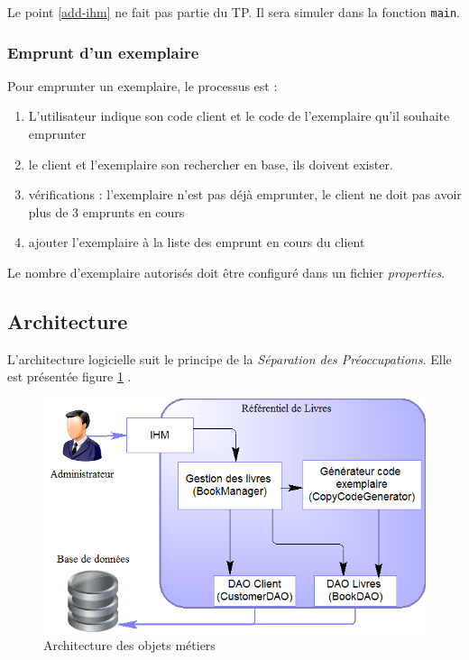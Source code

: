 \documentclass[small,algo]{dushClass}
\begin{document}
Le point \ref{add-ihm} ne fait pas partie du TP. Il sera simuler dans la fonction \texttt{main}.

\subsubsection{Emprunt d'un exemplaire}

Pour emprunter un exemplaire, le processus est :
\begin{enumerate}
\item L'utilisateur indique son code client et le code de l'exemplaire qu'il souhaite emprunter
\item le client et l'exemplaire son rechercher en base, ils doivent exister.
\item vérifications : l'exemplaire n'est pas déjà emprunter, le client ne doit pas avoir plus de 3 emprunts en cours
\item ajouter l'exemplaire à la liste des emprunt en cours du client\\
\end{enumerate}

Le nombre d'exemplaire autorisés doit être configuré dans un fichier \emph{properties}.

\subsection{Architecture}
L'architecture logicielle suit le principe de la \emph{Séparation des Préoccupations}. Elle est présentée figure \ref{tp-spring-soc} .\\

\begin{figure}[ht]\label{tp-spring-soc}
	\center
	\includegraphics{images/tp-spring-soc.png}
	\caption{Architecture des objets métiers}
\end{figure}
\end{document}
